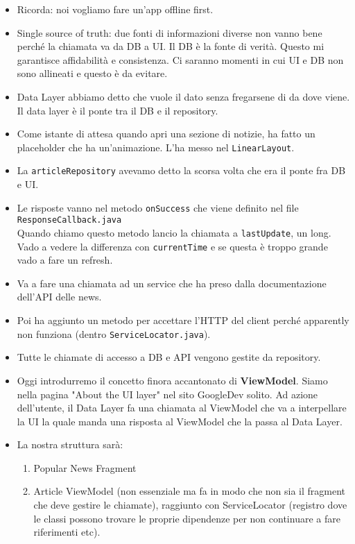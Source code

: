 \begin{itemize}
    \item Ricorda: noi vogliamo fare un'app offline first.
    \item Single source of truth: due fonti di informazioni diverse non vanno bene perché la chiamata va da DB a UI. Il DB è la fonte di verità. Questo mi garantisce affidabilità e consistenza. Ci saranno momenti in cui UI e DB non sono allineati e questo è da evitare.
    \item Data Layer abbiamo detto che vuole il dato senza fregarsene di da dove viene. Il data layer è il ponte tra il DB e il repository.
    \item Come istante di attesa quando apri una sezione di notizie, ha fatto un placeholder che ha un'animazione. L'ha messo nel \texttt{LinearLayout}.
    \item La \texttt{articleRepository} avevamo detto la scorsa volta che era il ponte fra DB e UI.
    \item Le risposte vanno nel metodo \texttt{onSuccess} che viene definito nel file \texttt{ResponseCallback.java}\\
    Quando chiamo questo metodo lancio la chiamata a \texttt{lastUpdate}, un long. Vado a vedere la differenza con \texttt{currentTime} e se questa è troppo grande vado a fare un refresh.
    \item Va a fare una chiamata ad un service che ha preso dalla documentazione dell'API delle news.
    \item Poi ha aggiunto un metodo per accettare l'HTTP del client perché apparently non funziona (dentro \texttt{ServiceLocator.java}).
    \item Tutte le chiamate di accesso a DB e API vengono gestite da repository.
    \item Oggi introdurremo il concetto finora accantonato di \textbf{ViewModel}. Siamo nella pagina "About the UI layer" nel sito GoogleDev solito. Ad azione dell'utente, il Data Layer fa una chiamata al ViewModel che va a interpellare la UI la quale manda una risposta al ViewModel che la passa al Data Layer.
    \item La nostra struttura sarà:
    \begin{enumerate}
        \item Popular News Fragment
        \item Article ViewModel (non essenziale ma fa in modo che non sia il fragment che deve gestire le chiamate), raggiunto con ServiceLocator (registro dove le classi possono trovare le proprie dipendenze per non continuare a fare riferimenti etc).

\end{enumerate}
\end{itemize}
